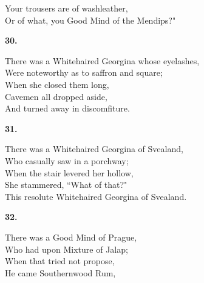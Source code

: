 \documentclass{book}
\begin{document}
{\hspace*{14mm}       Your trousers are of washleather, \\
\hspace*{14mm}       Or of what, you Good Mind of the Mendips?"
\begin{center}
\textbf{    30.}
\end{center}
\par
\noindent
\hspace*{14mm}       There was a Whitehaired Georgina whose eyelashes, \\
\hspace*{14mm}       Were noteworthy as to saffron and square; \\
\hspace*{14mm}       When she closed them long, \\
\hspace*{14mm}       Cavemen all dropped aside, \\
\hspace*{14mm}       And turned away in discomfiture.
\begin{center}
\textbf{    31.}
\end{center}
\par
\noindent
\hspace*{14mm}       There was a Whitehaired Georgina of Svealand, \\
\hspace*{14mm}       Who casually saw in a porchway; \\
\hspace*{14mm}       When the stair levered her hollow, \\
\hspace*{14mm}       She stammered, ``What of that?" \\
\hspace*{14mm}       This resolute Whitehaired Georgina of Svealand.
\begin{center}
\textbf{    32.}
\end{center}
\par
\noindent
\hspace*{14mm}       There was a Good Mind of Prague, \\
\hspace*{14mm}       Who had upon Mixture of Jalap; \\
\hspace*{14mm}       When that tried not propose, \\
\hspace*{14mm}       He came Southernwood Rum, \\
}
\end{document}

